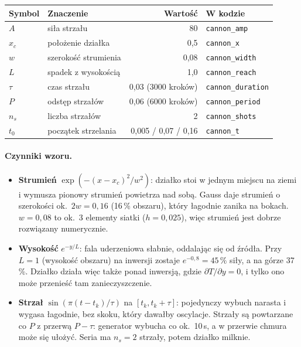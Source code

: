 \documentclass[11pt,a4paper]{article}
\begin{document}
\begin{center}
\begin{tabular}{@{}llrl@{}}
\toprule
Symbol & Znaczenie & Wartość & W kodzie \\
\midrule
$A$ & siła strzału & 80 & \texttt{cannon\_amp} \\
$x_c$ & położenie działka & 0,5 & \texttt{cannon\_x} \\
$w$ & szerokość strumienia & 0,08 & \texttt{cannon\_width} \\
$L$ & spadek z wysokością & 1,0 & \texttt{cannon\_reach} \\
$\tau$ & czas strzału & 0,03 (3000 kroków) & \texttt{cannon\_duration} \\
$P$ & odstęp strzałów & 0,06 (6000 kroków) & \texttt{cannon\_period} \\
$n_s$ & liczba strzałów & 2 & \texttt{cannon\_shots} \\
$t_0$ & początek strzelania & 0,005 / 0,07 / 0,16 & \texttt{cannon\_t} \\
\bottomrule
\end{tabular}
\end{center}

\paragraph{Czynniki wzoru.}
\begin{itemize}
\item \textbf{Strumień} $\exp(-(x - x_c)^2/w^2)$: działko stoi w jednym miejscu na ziemi
  i wymusza pionowy strumień powietrza nad sobą. Gauss daje strumień o szerokości ok.\ $2w = 0{,}16$
  (16\,\% obszaru), który łagodnie zanika na bokach. $w = 0{,}08$ to ok.\ 3 elementy siatki
  ($h = 0{,}025$), więc strumień jest dobrze rozwiązany numerycznie.
\item \textbf{Wysokość} $e^{-y/L}$: fala uderzeniowa słabnie, oddalając się od źródła.
  Przy $L = 1$ (wysokość obszaru) na inwersji zostaje $e^{-0{,}8} = 45\,\%$ siły, a na górze 37\,\%.
  Działko działa więc także ponad inwersją, gdzie $\partial T/\partial y = 0$, i tylko ono może
  przenieść tam zanieczyszczenie.
\item \textbf{Strzał} $\sin(\pi (t - t_k)/\tau)$ na $[t_k, t_k + \tau]$: pojedynczy wybuch narasta
  i wygasa łagodnie, bez skoku, który dawałby oscylacje. Strzały są powtarzane co $P$ z przerwą
  $P - \tau$: generator wybucha co ok.\ 10\,s, a w przerwie chmura może się ułożyć.
  Seria ma $n_s = 2$ strzały, potem działko milknie.
\end{itemize}
\end{document}

